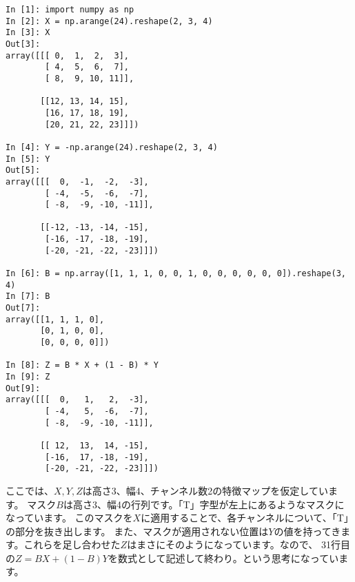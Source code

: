 \documentclass[uplatex,twocolumn,9pt,dvipdfmx]{jsarticle}
\begin{document}
\begin{verbatim}
In [1]: import numpy as np
In [2]: X = np.arange(24).reshape(2, 3, 4)
In [3]: X
Out[3]:
array([[[ 0,  1,  2,  3],
        [ 4,  5,  6,  7],
        [ 8,  9, 10, 11]],

       [[12, 13, 14, 15],
        [16, 17, 18, 19],
        [20, 21, 22, 23]]])

In [4]: Y = -np.arange(24).reshape(2, 3, 4)
In [5]: Y
Out[5]:
array([[[  0,  -1,  -2,  -3],
        [ -4,  -5,  -6,  -7],
        [ -8,  -9, -10, -11]],

       [[-12, -13, -14, -15],
        [-16, -17, -18, -19],
        [-20, -21, -22, -23]]])

In [6]: B = np.array([1, 1, 1, 0, 0, 1, 0, 0, 0, 0, 0, 0]).reshape(3, 4)
In [7]: B
Out[7]:
array([[1, 1, 1, 0],
       [0, 1, 0, 0],
       [0, 0, 0, 0]])

In [8]: Z = B * X + (1 - B) * Y
In [9]: Z
Out[9]:
array([[[  0,   1,   2,  -3],
        [ -4,   5,  -6,  -7],
        [ -8,  -9, -10, -11]],

       [[ 12,  13,  14, -15],
        [-16,  17, -18, -19],
        [-20, -21, -22, -23]]])
\end{verbatim}

ここでは、$X, Y, Z$は高さ3、幅4、チャンネル数2の特徴マップを仮定しています。
マスク$B$は高さ3、幅4の行列です。「T」字型が左上にあるようなマスクになっています。
このマスクを$X$に適用することで、各チャンネルについて、「T」の部分を抜き出します。
また、マスクが適用されない位置は$Y$の値を持ってきます。これらを足し合わせた$Z$はまさにそのようになっています。なので、
31行目の$Z=BX+(1-B)Y$を数式として記述して終わり。という思考になっています。
\end{document}
